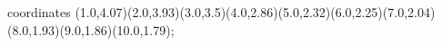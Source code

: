 					coordinates { (1.0,4.07)(2.0,3.93)(3.0,3.5)(4.0,2.86)(5.0,2.32)(6.0,2.25)(7.0,2.04)(8.0,1.93)(9.0,1.86)(10.0,1.79)};